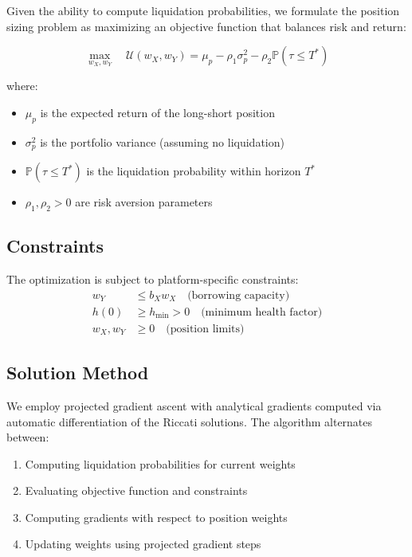 \documentclass{article}
\renewcommand{\P}{\mathbb{P}}
\theoremstyle{definition}
\begin{document}
Given the ability to compute liquidation probabilities, we formulate the position sizing problem as maximizing an objective function that balances risk and return:

\begin{equation}
\max_{w_X, w_Y} \quad \mathcal{U}(w_X, w_Y) = \mu_p - \rho_1 \sigma_p^2 - \rho_2 \P(\tau \leq T^*) \label{eq:objective}
\end{equation}

where:
\begin{itemize}
    \item $\mu_p$ is the expected return of the long-short position
    \item $\sigma_p^2$ is the portfolio variance (assuming no liquidation)
    \item $\P(\tau \leq T^*)$ is the liquidation probability within horizon $T^*$
    \item $\rho_1, \rho_2 > 0$ are risk aversion parameters
\end{itemize}

\subsection{Constraints}

The optimization is subject to platform-specific constraints:
\begin{align}
w_Y &\leq b_X w_X \quad \text{(borrowing capacity)} \\
h(0) &\geq h_{\min} > 0 \quad \text{(minimum health factor)} \\
w_X, w_Y &\geq 0 \quad \text{(position limits)}
\end{align}

\subsection{Solution Method}

We employ projected gradient ascent with analytical gradients computed via automatic differentiation of the Riccati solutions. The algorithm alternates between:
\begin{enumerate}
    \item Computing liquidation probabilities for current weights
    \item Evaluating objective function and constraints
    \item Computing gradients with respect to position weights
    \item Updating weights using projected gradient steps
\end{enumerate}
\end{document}
